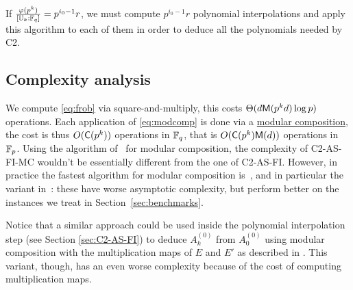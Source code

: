 If $\frac{\varphi(p^k)}{[\mathbb{U}_k:\mathbb{F}_q]} = p^{i_0-1}r$, we must compute
$p^{i_0-1}r$ polynomial interpolations and apply this algorithm to
each of them in order to deduce all the polynomials needed by C2.


\subsection{Complexity analysis}
We compute \eqref{eq:frob} via square-and-multiply, this costs
$\Theta(d\mathsf{M}(p^kd)\log p)$ operations. Each application of
\eqref{eq:modcomp} is done via a \hyperref[todo]{modular composition},
the cost is thus $O(\mathsf{C}(p^k))$ operations in $\mathbb{F}_q$, that is
$O(\mathsf{C}(p^k)\mathsf{M}(d))$ operations in $\mathbb{F}_p$. Using the algorithm
of~\cite{kedlaya+umans08} for modular composition, the complexity of
C2-AS-FI-MC wouldn't be essentially different from the one of
C2-AS-FI. However, in practice the fastest algorithm for modular
composition is~\cite{brent+kung}, and in particular the variant
in~\cite[Lemma~3]{kaltofen+shoup98}: these have worse asymptotic
complexity, but perform better on the instances we treat in
Section~\ref{sec:benchmarks}.

Notice that a similar approach could be used inside the polynomial
interpolation step (see Section \ref{sec:C2-AS-FI}) to deduce
$A_k^{(0)}$ from $A_0^{(0)}$ using modular composition with the
multiplication maps of $E$ and $E'$ as described in
\cite[$\S$2.3]{couveignes96}. This variant, though, has an even worse
complexity because of the cost of computing multiplication maps.




%
